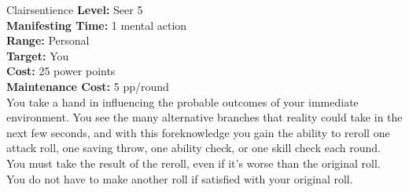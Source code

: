 {Clairsentience}
{
	\textbf{Level:}
	Seer 5\\
	\textbf{Manifesting Time:}
	1 mental action\\
	\textbf{Range:}
	Personal\\
	\textbf{Target:}
	You\\
	\textbf{Cost:}
	25 power points\\
	\textbf{Maintenance Cost:}
	5 pp/round\\
}
{
	You take a hand in influencing the probable outcomes of your immediate environment. You see the many alternative branches that reality could take in the next few seconds, and with this foreknowledge you gain the ability to reroll one attack roll, one saving throw, one ability check, or one skill check each round. You must take the result of the reroll, even if it's worse than the original roll. You do not have to make another roll if satisfied with your original roll.
}
